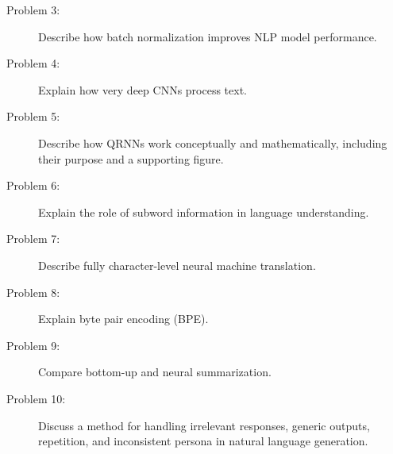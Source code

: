 \documentclass[10pt]{article}
\begin{document}
\begin{description}
\item[Problem 3:]  Describe how batch normalization improves NLP model performance.

\pagebreak

\item[Problem 4:]  Explain how very deep CNNs process text.

\pagebreak

\item[Problem 5:]  Describe how QRNNs work conceptually and mathematically, including their purpose and a supporting figure.

\pagebreak

\item[Problem 6:]  Explain the role of subword information in language understanding.

\pagebreak

\item[Problem 7:]  Describe fully character-level neural machine translation.

\pagebreak

\item[Problem 8:]  Explain byte pair encoding (BPE).

\pagebreak

\item[Problem 9:]  Compare bottom-up and neural summarization.

\pagebreak


\item[Problem 10:]  Discuss a method for handling irrelevant responses, generic outputs, repetition, and inconsistent persona in natural language generation.


\end{description}
\end{document}
